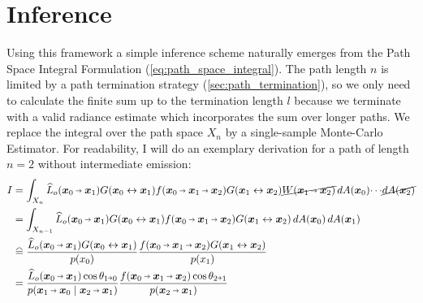 \section{Inference}
\label{sec:inference}
Using this framework a simple inference scheme naturally emerges from the Path Space Integral Formulation (\cref{eq:path_space_integral}).
The path length $n$ is limited by a path termination strategy (\cref{sec:path_termination}), so we only need to calculate the finite sum up to the termination length $l$ because we terminate with a valid radiance estimate which incorporates the sum over longer paths.
We replace the integral over the path space $X_n$ by a single-sample Monte-Carlo Estimator.
For readability, I will do an exemplary derivation for a path of length $n=2$ without intermediate emission:
\begin{subequations}
\begin{align}
    I
    &= \int_{X_n} \widehat{L}_o(\pdir{0}{1}) \G{0}{1} \f{0}{1}{2} \G{1}{2} \cancel{W(\pdir{1}{2})} \diff A(\vec{x}_0) \!\cdots\! \cancel{\diff A(\vec{x}_2)}\notag\\
    &= \int_{X_{n-1}} \widehat{L}_o(\pdir{0}{1}) \G{0}{1} \f{0}{1}{2} \G{1}{2} \diff A(\vec{x}_0) \diff A(\vec{x}_1) \label{eq:cancelw}\\
    &\eqhat \frac{\widehat{L}_o(\pdir{0}{1}) \G{0}{1}}{p(x_0)}  \frac{\f{0}{1}{2} \G{1}{2}}{p(x_1)} \label{eq:pmc}\\
    &= \frac{\widehat{L}_o(\pdir{0}{1}) \cos\theta_{1\veryshortarrow0}}{p(\pdir{1}{0}\mid\pdir{2}{1})}  \frac{\f{0}{1}{2} \cos\theta_{2\veryshortarrow1}}{p(\pdir{2}{1})} \label{eq:area2solid}
\end{align} %
\end{subequations}
